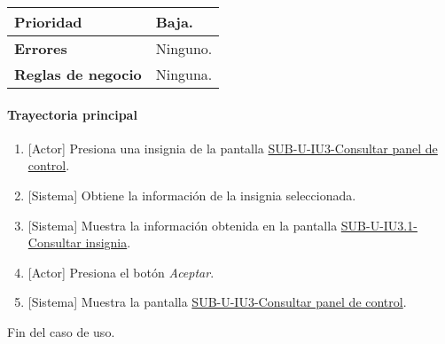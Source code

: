 \begin{longtable}{|J{5cm}|J{10.3cm}|}
		\\ \hline 
	\textbf{Prioridad} & 
		Baja. \\ \hline
	\textbf{Errores} & Ninguno.
		\\ \hline
	\textbf{Reglas de negocio} & Ninguna.
		 \\ \hline
\end{longtable}

\paragraph{Trayectoria principal}
	\begin{enumerate}
		\item {[Actor]} Presiona una insignia de la pantalla \hyperref[fig:sub-u-iu3]{SUB-U-IU3-Consultar panel de control}.
		\item {[Sistema]} Obtiene la información de la insignia seleccionada.
		\item {[Sistema]} Muestra la información obtenida en la pantalla \hyperref[fig:sub-u-iu3.1]{SUB-U-IU3.1-Consultar insignia}.
		\item {[Actor]} Presiona el botón \textit{Aceptar}.
		\item {[Sistema]} Muestra la pantalla \hyperref[fig:sub-u-iu3]{SUB-U-IU3-Consultar panel de control}.
	\end{enumerate}
	Fin del caso de uso.

